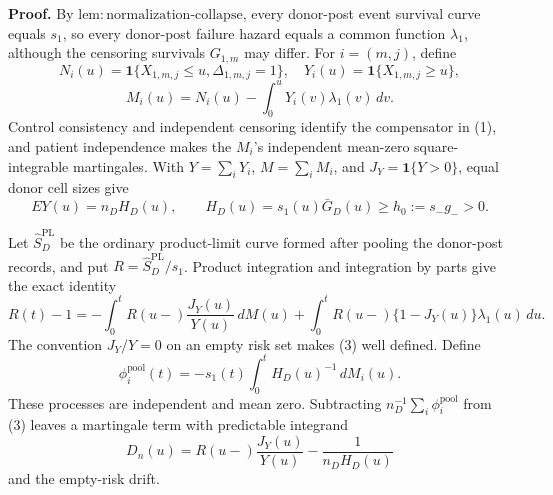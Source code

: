 \textbf{Proof.}
By \(\mathrm{lem:normalization\mbox{-}collapse}\), every donor-post event survival curve equals \(s_1\), so every donor-post failure hazard equals a common function \(\lambda_1\), although the censoring survivals \(G_{1,m}\) may differ. For \(i=(m,j)\), define
\[
 N_i(u)=\mathbf1\{X_{1,m,j}\le u,\Delta_{1,m,j}=1\},
 \quad Y_i(u)=\mathbf1\{X_{1,m,j}\ge u\},
\]
\[
 M_i(u)=N_i(u)-\int_0^uY_i(v)\lambda_1(v)\,dv.          \tag{1}
\]
Control consistency and independent censoring identify the compensator in (1), and patient independence makes the \(M_i\)'s independent mean-zero square-integrable martingales. With \(Y=\sum_iY_i\), \(M=\sum_iM_i\), and \(J_Y=\mathbf1\{Y>0\}\), equal donor cell sizes give
\[
 EY(u)=n_DH_D(u),
 \qquad H_D(u)=s_1(u)\bar G_D(u)\ge h_0:=s_-g_->0.      \tag{2}
\]

Let \(\widehat S_D^{\mathrm{PL}}\) be the ordinary product-limit curve formed after pooling the donor-post records, and put \(R=\widehat S_D^{\mathrm{PL}}/s_1\). Product integration and integration by parts give the exact identity
\[
 R(t)-1=-\int_0^tR(u-)\frac{J_Y(u)}{Y(u)}\,dM(u)
 +\int_0^tR(u-)\{1-J_Y(u)\}\lambda_1(u)\,du.           \tag{3}
\]
The convention \(J_Y/Y=0\) on an empty risk set makes (3) well defined. Define
\[
 \phi_i^{\mathrm{pool}}(t)
 =-s_1(t)\int_0^tH_D(u)^{-1}\,dM_i(u).                  \tag{4}
\]
These processes are independent and mean zero. Subtracting \(n_D^{-1}\sum_i\phi_i^{\mathrm{pool}}\) from (3) leaves a martingale term with predictable integrand
\[
 D_n(u)=R(u-)\frac{J_Y(u)}{Y(u)}-\frac1{n_DH_D(u)}       \tag{5}
\]
and the empty-risk drift.

